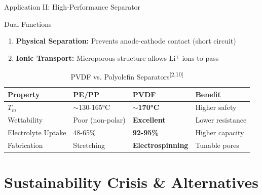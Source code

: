 \documentclass[aspectratio=169]{beamer}
\begin{document}
\begin{frame}{Application II: High-Performance Separator}
    \begin{block}{Dual Functions}
        \begin{enumerate}
            \item \textbf{Physical Separation:} Prevents anode-cathode contact (short circuit)
            \item \textbf{Ionic Transport:} Microporous structure allows Li$^+$ ions to pass
        \end{enumerate}
    \end{block}
    
    \begin{table}
        \caption{PVDF vs. Polyolefin Separators\textsuperscript{[2,10]}}
        \centering\footnotesize
        \begin{tabular}{llll}
            \toprule
            \textbf{Property} & \textbf{PE/PP} & \textbf{PVDF} & \textbf{Benefit} \\
            \midrule
            $T_m$ & $\sim$130-165\si{\celsius} & \textbf{$\sim$170\si{\celsius}} & \textcolor{HighlightGreen}{Higher safety} \\
            Wettability & Poor (non-polar) & \textbf{Excellent} & \textcolor{HighlightGreen}{Lower resistance} \\
            Electrolyte Uptake & 48-65\% & \textbf{92-95\%} & \textcolor{HighlightGreen}{Higher capacity} \\
            Fabrication & Stretching & \textbf{Electrospinning} & \textcolor{HighlightGreen}{Tunable pores} \\
            \bottomrule
        \end{tabular}
    \end{table}
\end{frame}

\section{Sustainability Crisis \& Alternatives}
\end{document}
